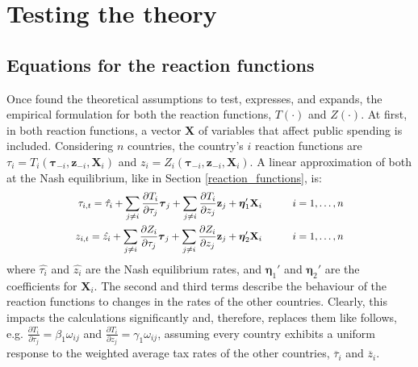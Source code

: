 \section{Testing the theory}
\vspace{-10pt}
\subsection{Equations for the reaction functions}\label{empirical-spec}

Once found the theoretical assumptions to test, \textcite{dev-loc-red-08} expresses, and expands, the empirical formulation for both the reaction functions, $T(\cdot)$ and $Z(\cdot)$. At first, in both reaction functions, a vector $\textbf{X}$ of variables that affect public spending is included. Considering $n$ countries, the country's $i$ reaction functions are ${\tau}_i=T_i(\boldsymbol{\tau}_{-i},\textbf{z}_{-i},\textbf{X}_i)$ and $z_i=Z_i(\boldsymbol{\tau}_{-i},\textbf{z}_{-i},\textbf{X}_i)$. A linear approximation of both at the Nash equilibrium, like in Section \ref{reaction_functions}, is:
\begin{align}
\vspace{-5pt}
\label{eq2.7} \scalemath{0.9}{\tau_{i,t}=\hat{\tau_i}+\sum_{j\neq i}\frac{\partial T_i}{\partial \tau_j}\boldsymbol{\tau}_j+\sum_{j\neq i}\frac{\partial T_i}{\partial z_j}\textbf{z}_j+\boldsymbol{\eta}_{1}'\textbf{X}_i \quad \quad \quad i=1,\dots,n}\\
\label{eq2.8} \scalemath{0.9}{z_{i,t}=\hat{z_i}+\sum_{j\neq i}\frac{\partial Z_i}{\partial \tau_j}\boldsymbol{\tau}_j+\sum_{j\neq i}\frac{\partial Z_i}{\partial z_j}\textbf{z}_j+\boldsymbol{\eta}_{2}'\textbf{X}_i \quad \quad \quad i=1,\dots,n}
\vspace{-5pt}
\end{align}
where $\hat{\tau_i}$ and $\hat{z_i}$ are the Nash equilibrium rates, and $\boldsymbol{\eta}_{1}'$ and $\boldsymbol{\eta}_{2}'$ are the coefficients for $\textbf{X}_i$. The second and third terms describe the behaviour of the reaction functions to changes in the rates of the other countries. Clearly, this impacts the calculations significantly and, therefore, \textcite{dev-loc-red-08} replaces them like follows, e.g. $\frac{\partial T_i}{\partial \tau_j}=\beta_1\omega_{ij}$ and $\frac{\partial T_i}{\partial z_j}=\gamma_1\omega_{ij}$, assuming every country exhibits a uniform response to the weighted average tax rates of the other countries, $\overline{\tau}_i$ and $\overline{z}_i$.

